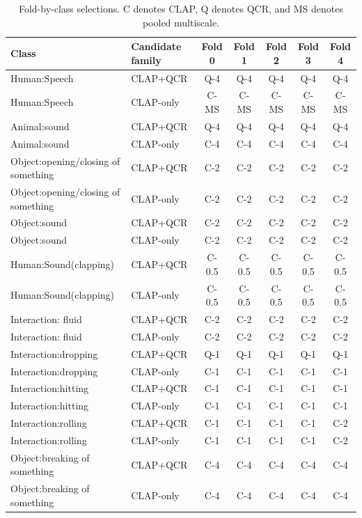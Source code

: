 \begin{table}[t]
\caption{Fold-by-class selections. C denotes CLAP, Q denotes QCR, and MS denotes pooled multiscale.}
\centering
\scriptsize
\begin{tabular}{llccccc}
\toprule
Class & Candidate family & Fold 0 & Fold 1 & Fold 2 & Fold 3 & Fold 4\\
\midrule
Human:Speech & CLAP+QCR & Q-4 & Q-4 & Q-4 & Q-4 & Q-4\\
Human:Speech & CLAP-only & C-MS & C-MS & C-MS & C-MS & C-MS\\
Animal:sound & CLAP+QCR & Q-4 & Q-4 & Q-4 & Q-4 & Q-4\\
Animal:sound & CLAP-only & C-4 & C-4 & C-4 & C-4 & C-4\\
Object:opening/closing of something & CLAP+QCR & C-2 & C-2 & C-2 & C-2 & C-2\\
Object:opening/closing of something & CLAP-only & C-2 & C-2 & C-2 & C-2 & C-2\\
Object:sound & CLAP+QCR & C-2 & C-2 & C-2 & C-2 & C-2\\
Object:sound & CLAP-only & C-2 & C-2 & C-2 & C-2 & C-2\\
Human:Sound(clapping) & CLAP+QCR & C-0.5 & C-0.5 & C-0.5 & C-0.5 & C-0.5\\
Human:Sound(clapping) & CLAP-only & C-0.5 & C-0.5 & C-0.5 & C-0.5 & C-0.5\\
Interaction: fluid & CLAP+QCR & C-2 & C-2 & C-2 & C-2 & C-2\\
Interaction: fluid & CLAP-only & C-2 & C-2 & C-2 & C-2 & C-2\\
Interaction:dropping & CLAP+QCR & Q-1 & Q-1 & Q-1 & Q-1 & Q-1\\
Interaction:dropping & CLAP-only & C-1 & C-1 & C-1 & C-1 & C-1\\
Interaction:hitting & CLAP+QCR & C-1 & C-1 & C-1 & C-1 & C-1\\
Interaction:hitting & CLAP-only & C-1 & C-1 & C-1 & C-1 & C-1\\
Interaction:rolling & CLAP+QCR & C-1 & C-1 & C-1 & C-1 & C-2\\
Interaction:rolling & CLAP-only & C-1 & C-1 & C-1 & C-1 & C-2\\
Object:breaking of something & CLAP+QCR & C-4 & C-4 & C-4 & C-4 & C-4\\
Object:breaking of something & CLAP-only & C-4 & C-4 & C-4 & C-4 & C-4\\
\bottomrule
\end{tabular}
\end{table}
